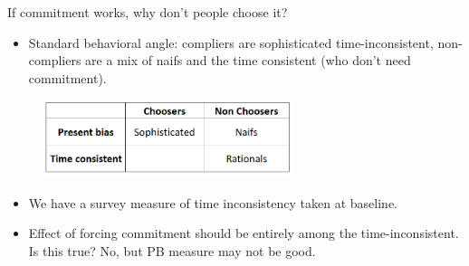 \documentclass[8pt]{beamer}
\begin{document}
\begin{frame}{If commitment works, why don't people choose it?}
{    \begin{itemize}
    \item   Standard behavioral angle:  compliers are sophisticated time-inconsistent, non-compliers are a mix of naifs and the time consistent (who don't need commitment).  
    \end{itemize}
\begin{figure}[H]
    \begin{center}
        \centering
        \includegraphics[width=0.65\textwidth]{Figuras/hyperbolicity_strata.png}
    \end{center}
\end{figure}   
    \begin{itemize}
    \item We have a survey measure of time inconsistency taken at baseline.
    \item  Effect of forcing commitment should be entirely among the time-inconsistent.  Is this true?  No, but PB measure may not be good.
    \end{itemize}
}

\end{frame}
\end{document}
